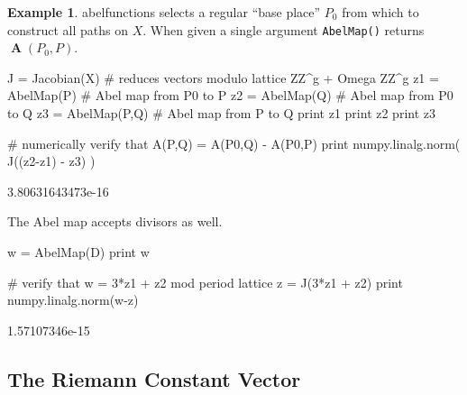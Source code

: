 \documentclass[12pt]{article}
\theoremstyle{definition}
\newtheorem{example}[theorem]{Example}
\DeclareMathOperator{\Abel}{\boldsymbol{A}}
\begin{document}
\begin{example}
{\sc abelfunctions} selects a regular ``base place'' $P_0$ from which to
construct all paths on $X$. When given a single argument {\tt AbelMap()}
returns $\Abel(P_0,P)$.
\begin{ipythoninput}
J = Jacobian(X)   # reduces vectors modulo lattice ZZ^g + Omega ZZ^g
z1 = AbelMap(P)   # Abel map from P0 to P
z2 = AbelMap(Q)   # Abel map from P0 to Q
z3 = AbelMap(P,Q) # Abel map from P to Q
print z1
print z2
print z3

# numerically verify that A(P,Q) = A(P0,Q) - A(P0,P)
print numpy.linalg.norm( J((z2-z1) - z3) )
\end{ipythoninput}
\begin{ipythonoutput}
[-0.5261+0.0864j  0.0669+0.6392j -0.7495+1.1037j -1.5030+1.0356j]
[-0.3875+0.1157j -0.0290+0.4437j -0.4532+0.7774j -0.9721+0.6732j]
[ 0.1468-0.0985j  0.8467+0.6989j  0.0996+1.0083j -1.1003+0.8159j]
3.80631643473e-16
\end{ipythonoutput}
The Abel map accepts divisors as well.
\begin{ipythoninput}
w = AbelMap(D)
print w

# verify that w = 3*z1 + z2 mod period lattice
z = J(3*z1 + z2)
print numpy.linalg.norm(w-z)
\end{ipythoninput}
\begin{ipythonoutput}
[ 0.0670-0.1361j  0.9421+0.7429j -0.4887+0.7663j -1.5057+0.6992j]
1.57107346e-15
\end{ipythonoutput}
\end{example}



\subsection{The Riemann Constant Vector}
\end{document}
